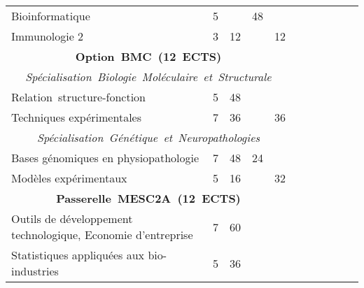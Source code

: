 \begin{tabular}{|m{5cm}|cm{0.75cm}|cm{0.75cm}|cm{0.75cm}|cm{0.75cm}|cm{0.75cm}|}
 \color{black} Bioinformatique & \color{black} 5 & \color{black} & \color{black} 48 & \\ \cline{1-5}

 \cellcolor{couleurClaire} \color{couleurTexte} Immunologie 2 & \cellcolor{couleurClaire} \color{couleurTexte} 3 & \cellcolor{couleurClaire} \color{couleurTexte} 12 & \cellcolor{couleurClaire} \color{couleurTexte} & \cellcolor{couleurClaire} \color{couleurTexte} 12
\\ \cline{1-5}
\multicolumn{5}{|c|}{\color{black} \mbox{\textbf{Option BMC (12 ECTS)}}}  \\ \cline{1-5}

\multicolumn{5}{|c|}{\color{black} \mbox{\textit{Spécialisation Biologie Moléculaire et Structurale}}}  \\ \cline{1-5}

 \color{black} \mbox{Relation structure-fonction} & \color{black} 5 & \color{black} 48 & \color{black} & \color{black} \\ \cline{1-5}

 \cellcolor{couleurClaire} \color{couleurTexte} Techniques expérimentales  & \cellcolor{couleurClaire} \color{couleurTexte} 7 & \cellcolor{couleurClaire} \color{couleurTexte} 36 & \cellcolor{couleurClaire} \color{couleurTexte} & \cellcolor{couleurClaire} \color{couleurTexte} 36 \\ \cline{1-5}

\multicolumn{5}{|c|}{\color{black} \mbox{\textit{Spécialisation Génétique et Neuropathologies}}}  \\ \cline{1-5}

 \color{black} Bases génomiques en physiopathologie  & \color{black} 7 & \color{black} 48 & \color{black} 24 & \color{black} \\ \cline{1-5}

 \cellcolor{couleurClaire} \color{couleurTexte} Modèles expérimentaux  & \cellcolor{couleurClaire} \color{couleurTexte} 5 & \cellcolor{couleurClaire} \color{couleurTexte} 16 & \cellcolor{couleurClaire} \color{couleurTexte} & \cellcolor{couleurClaire} \color{couleurTexte} 32 \\ \cline{1-5}


\multicolumn{5}{|c|}{\color{black} \mbox{\textbf{Passerelle MESC2A (12 ECTS)}}}  \\ \cline{1-5}

 \color{black} Outils de développement technologique, Economie d'entreprise  & \color{black} 7 & \color{black} 60 & \color{black} & \color{black} \\ \cline{1-5}

 \cellcolor{couleurClaire} \color{couleurTexte} Statistiques appliquées aux bio-industries  & \cellcolor{couleurClaire} \color{couleurTexte} 5 & \cellcolor{couleurClaire} \color{couleurTexte} 36 & \cellcolor{couleurClaire} \color{couleurTexte} & \cellcolor{couleurClaire} \color{couleurTexte} \\ \cline{1-5}

\end{tabular}

